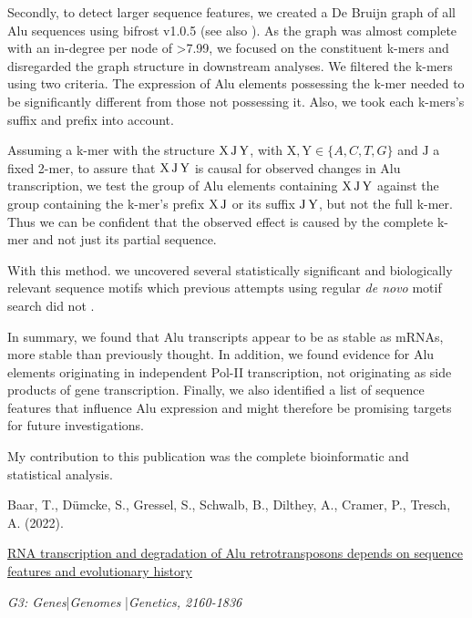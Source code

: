 \noindent Secondly,\label{mar:alugraph} to detect
larger sequence features, we created a De Bruijn graph of all Alu sequences
using bifrost v1.0.5 \citep{Holley2020} (see also ).
As the graph was almost complete with an in-degree per node of \num{>7.99}, we
focused on the constituent k-mers and disregarded the graph structure in
downstream analyses. We filtered the k-mers using two criteria. The expression
of Alu elements possessing the k-mer needed to be significantly different from
those not possessing it. Also, we took each k-mers's suffix and prefix into
account.

Assuming a k-mer with the structure $\text{X\,J\,Y}$, with
$\text{X},\text{Y}\in\{A,C,T,G\}$ and $\text{J}$ a fixed 2-mer, to assure that
$\text{X\,J\,Y}$ is causal for observed changes in Alu transcription, we test
the group of Alu elements containing $\text{X\,J\,Y}$ against the group
containing the k-mer's prefix $\text{X\,J}$ or its suffix $\text{J\,Y}$, but
not the full k-mer. Thus we can be confident that the observed effect is
caused by the complete k-mer and not just its partial sequence.

\noindent With this method. we uncovered several statistically significant and
biologically relevant sequence motifs which previous attempts using regular
\textit{de novo} motif search did not \citep{Zhang2019}.
\bigbreak

\noindent In summary, we found that Alu transcripts appear to be as stable as
mRNAs, more stable than previously thought. In addition, we found evidence for
Alu elements originating in independent Pol-II transcription, not originating
as side products of gene transcription. Finally, we also identified a list of
sequence features that influence Alu expression and might therefore be
promising targets for future investigations.

\vfill
\noindent My contribution to this publication was the complete bioinformatic
and statistical analysis.\nopagebreak
\medskip
\begin{tcolorbox}[
  boxrule=0pt, leftrule=1pt, colframe=s-blue, colback=white, sharp corners=all]%
  \raggedright
  Baar, T., Dümcke, S., Gressel, S., Schwalb, B.,
  Dilthey, A., Cramer, P., Tresch, A. (2022).
  
  \smallskip
  \href{https://doi.org/10.1093/g3journal/jkac054}
    {RNA transcription and degradation of Alu retrotransposons depends on
    sequence features and evolutionary history}

  \smallskip
  \textit{G3: Genes}\thinspace{}|\thinspace{}\textit{Genomes}%
    \thinspace{}|\thinspace{}\textit{Genetics, 2160-1836}
\end{tcolorbox}

